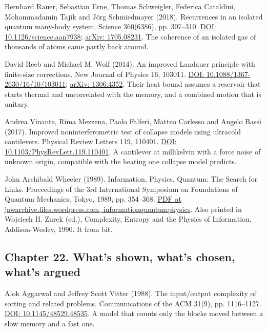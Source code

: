 \documentclass[11pt,twoside]{article}
\theoremstyle{thielethm}
\theoremstyle{thieledef}
\theoremstyle{thieledef}
\theoremstyle{thieledef}
\theoremstyle{thielethm}
\theoremstyle{thieleobs}
\theoremstyle{thielethm}
\begin{document}
\noindent Bernhard Rauer, Sebastian Erne, Thomas Schweigler, Federica Cataldini, Mohammadamin Tajik and J\"org Schmiedmayer (2018). Recurrences in an isolated quantum many-body system. Science 360(6386), pp. 307--310. \href{https://doi.org/10.1126/science.aan7938}{DOI: 10.1126/science.aan7938}; \href{https://arxiv.org/abs/1705.08231}{arXiv: 1705.08231}. The coherence of an isolated gas of thousands of atoms came partly back around.
\par\medskip

\noindent David Reeb and Michael M. Wolf (2014). An improved Landauer principle with finite-size corrections. New Journal of Physics 16, 103011. \href{https://doi.org/10.1088/1367-2630/16/10/103011}{DOI: 10.1088/1367-2630/16/10/103011}; \href{https://arxiv.org/abs/1306.4352}{arXiv: 1306.4352}. Their heat bound assumes a reservoir that starts thermal and uncorrelated with the memory, and a combined motion that is unitary.
\par\medskip

\noindent Andrea Vinante, Rima Mezzena, Paolo Falferi, Matteo Carlesso and Angelo Bassi (2017). Improved noninterferometric test of collapse models using ultracold cantilevers. Physical Review Letters 119, 110401. \href{https://doi.org/10.1103/PhysRevLett.119.110401}{DOI: 10.1103/PhysRevLett.119.110401}. A cantilever at millikelvin with a force noise of unknown origin, compatible with the heating one collapse model predicts.
\par\medskip

\noindent John Archibald Wheeler (1989). Information, Physics, Quantum: The Search for Links. Proceedings of the 3rd International Symposium on Foundations of Quantum Mechanics, Tokyo, 1989, pp. 354--368. \href{https://jawarchive.files.wordpress.com/2012/03/informationquantumphysics.pdf}{PDF at jawarchive.files.wordpress.com, informationquantumphysics}. Also printed in Wojciech H. Zurek (ed.), Complexity, Entropy and the Physics of Information, Addison-Wesley, 1990. It from bit.
\par\medskip

\subsection*{Chapter 22. What's shown, what's chosen, what's argued}

\noindent Alok Aggarwal and Jeffrey Scott Vitter (1988). The input/output complexity of sorting and related problems. Communications of the ACM 31(9), pp. 1116--1127. \href{https://doi.org/10.1145/48529.48535}{DOI: 10.1145/48529.48535}. A model that counts only the blocks moved between a slow memory and a fast one.
\par\medskip
\end{document}
